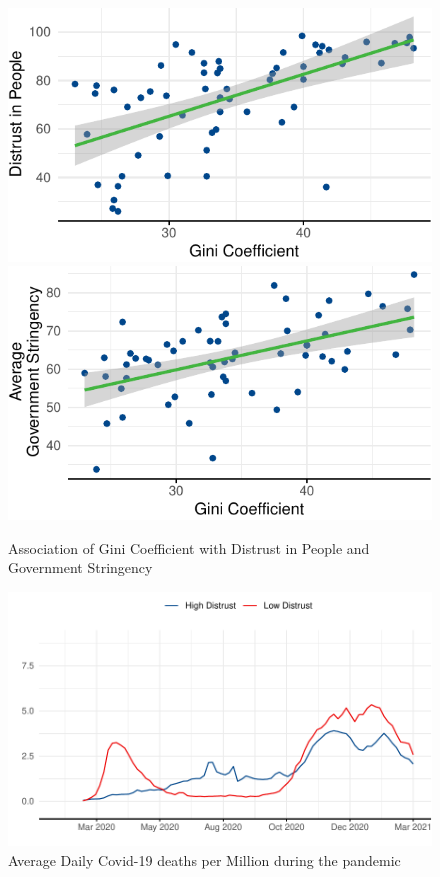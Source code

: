 \documentclass[
  12pt,
]{article}
\begin{document}
\begin{figure}
\includegraphics[width=0.48\linewidth]{write_up_test_files/figure-latex/gini-plots-1} \includegraphics[width=0.48\linewidth]{write_up_test_files/figure-latex/gini-plots-2} \caption{Association of Gini Coefficient with Distrust in People and Government Stringency}\label{fig:gini-plots}
\end{figure}

\begin{figure}
\includegraphics[width=0.8\linewidth]{write_up_test_files/figure-latex/deaths-change-1} \caption{Average Daily Covid-19 deaths per Million during the pandemic}\label{fig:deaths-change}
\end{figure}
\end{document}
